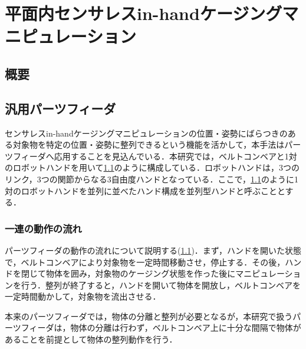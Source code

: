 \documentclass[a4paper,twoside,12pt,papersize, dvipdfmx]{iirthesis}
\begin{document}
    \newcommand{\figref}[1]{\figurename\ref{#1}}
    \newcommand{\tabref}[1]{\tablename\ref{#1}}
    \renewcommand{\eqref}[1]{式~(\ref{#1})}
    \newcommand{\chapref}[1]{\ref{#1}章}
    \newcommand{\secref}[1]{\ref{#1}節}
    \newcommand{\ssecref}[1]{\ref{#1}項}
    \newcommand{\appref}[1]{付録\ref{#1}}
\fi


\chapter{平面内センサレスin-handケージングマニピュレーション}\label{chap::sicm}
\minitoc

\section{概要}


\section{汎用パーツフィーダ}\label{sec::sicm::partsfeeder}
センサレスin-handケージングマニピュレーションの位置・姿勢にばらつきのある対象物を特定の位置・姿勢に整列できるという機能を活かして，本手法はパーツフィーダへ応用することを見込んでいる．本研究では，ベルトコンベアと1対のロボットハンドを用いて\figref{}のように構成している．ロボットハンドは，3つのリンク，3つの関節からなる3自由度ハンドとなっている．ここで，\figref{}のように1対のロボットハンドを並列に並べたハンド構成を並列型ハンドと呼ぶこととする．
\subsection{一連の動作の流れ\cite{kamikukita2022}}\label{subsec::sicm::flow}
パーツフィーダの動作の流れについて説明する(\figref{})．まず，ハンドを開いた状態で，ベルトコンベアにより対象物を一定時間移動させ，停止する．その後，ハンドを閉じて物体を囲み，対象物のケージング状態を作った後にマニピュレーションを行う．整列が終了すると，ハンドを開いて物体を開放し，ベルトコンベアを一定時間動かして，対象物を流出させる．\par
本来のパーツフィーダでは，物体の分離と整列が必要となるが，本研究で扱うパーツフィーダは，物体の分離は行わず，ベルトコンベア上に十分な間隔で物体があることを前提として物体の整列動作を行う．
\end{document}
